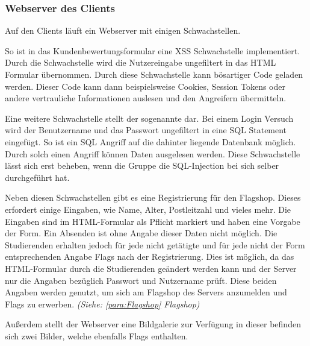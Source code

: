 \subsubsection{Webserver des Clients}\label{subsubsec:Webserver_des_Clients}
Auf den Clients läuft ein Webserver mit einigen Schwachstellen. 

So ist in das Kundenbewertungsformular eine XSS Schwachstelle implementiert. Durch die Schwachstelle wird die Nutzereingabe ungefiltert in das HTML Formular übernommen. Durch diese Schwachstelle kann bösartiger Code geladen werden. Dieser Code kann dann beispielsweise Cookies, Session Tokens oder andere vertrauliche Informationen auslesen und den Angreifern übermitteln. 

Eine weitere Schwachstelle stellt der sogenannte  dar. Bei einem Login Versuch wird der Benutzername und das Passwort ungefiltert in eine SQL Statement eingefügt. So ist ein SQL Angriff auf die dahinter liegende Datenbank möglich. Durch solch einen Angriff können Daten ausgelesen werden. Diese Schwachstelle lässt sich erst beheben, wenn die Gruppe die SQL-Injection bei sich selber durchgeführt hat.

Neben diesen Schwachstellen gibt es eine Registrierung für den Flagshop. Dieses erfordert einige Eingaben, wie Name, Alter, Postleitzahl und vieles mehr. Die Eingaben sind im HTML-Formular als Pflicht markiert und haben eine Vorgabe der Form. Ein Absenden ist ohne Angabe dieser Daten nicht möglich. Die Studierenden erhalten jedoch für jede nicht getätigte und für jede nicht der Form entsprechenden Angabe Flags nach der Registrierung. Dies ist möglich, da das HTML-Formular durch die Studierenden geändert werden kann und der Server nur die Angaben bezüglich Passwort und Nutzername prüft. Diese beiden Angaben werden genutzt, um sich am Flagshop des Servers anzumelden und Flags zu erwerben. \textit{(Siehe: \ref{para:Flagshop} Flagshop)}

Außerdem stellt der Webserver eine Bildgalerie zur Verfügung in dieser befinden sich zwei Bilder, welche ebenfalls Flags enthalten.
